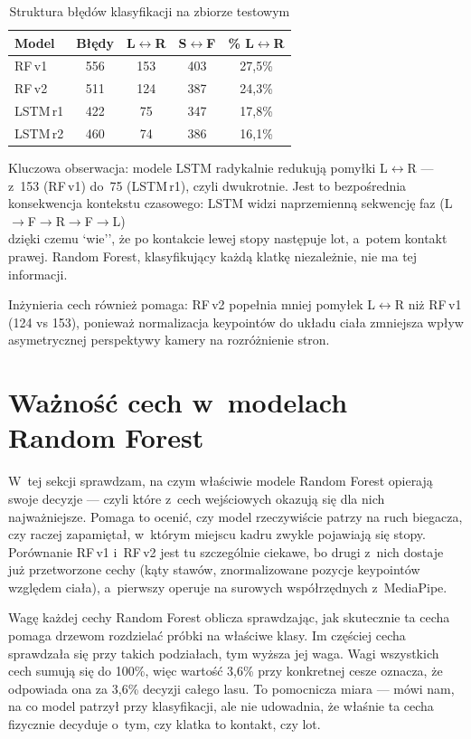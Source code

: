 \begin{table}[htbp]
\centering
\caption{Struktura błędów klasyfikacji na zbiorze testowym}
\label{tab:error-breakdown}
\small
\begin{tabular}{lcccc}
\hline
\textbf{Model} & \textbf{Błędy} & \textbf{L$\leftrightarrow$R} & \textbf{S$\leftrightarrow$F} & \textbf{\% L$\leftrightarrow$R} \\
\hline
RF\,v1   & 556 & 153 & 403 & 27{,}5\% \\
RF\,v2   & 511 & 124 & 387 & 24{,}3\% \\
LSTM\,r1 & 422 &  75 & 347 & 17{,}8\% \\
LSTM\,r2 & 460 &  74 & 386 & 16{,}1\% \\
\hline
\end{tabular}
\end{table}

Kluczowa obserwacja: modele LSTM radykalnie redukują pomyłki L$\leftrightarrow$R --- z~153 (RF\,v1) do~75 (LSTM\,r1), czyli dwukrotnie. Jest to bezpośrednia konsekwencja kontekstu czasowego: LSTM widzi naprzemienną sekwencję faz (L$\to$F$\to$R$\to$F$\to$L) \\dzięki czemu `wie'', że po kontakcie lewej stopy następuje lot, a~potem kontakt prawej. Random Forest, klasyfikujący każdą klatkę niezależnie, nie ma tej informacji.

Inżynieria cech również pomaga: RF\,v2 popełnia mniej pomyłek L$\leftrightarrow$R niż RF\,v1 (124 vs 153), ponieważ normalizacja keypointów do układu ciała zmniejsza wpływ asymetrycznej perspektywy kamery na rozróżnienie stron.


\section{Ważność cech w~modelach Random Forest}
\label{sec:feature-importance}

W~tej sekcji sprawdzam, na czym właściwie modele Random Forest opierają swoje decyzje --- czyli które z~cech wejściowych okazują się dla nich najważniejsze. Pomaga to ocenić, czy model rzeczywiście patrzy na ruch biegacza, czy raczej zapamiętał, w~którym miejscu kadru zwykle pojawiają się stopy. Porównanie RF\,v1 i~RF\,v2 jest tu szczególnie ciekawe, bo drugi z~nich dostaje już przetworzone cechy (kąty stawów, znormalizowane pozycje keypointów względem ciała), a~pierwszy operuje na surowych współrzędnych z~MediaPipe.

Wagę każdej cechy Random Forest oblicza sprawdzając, jak skutecznie ta cecha pomaga drzewom rozdzielać próbki na właściwe klasy. Im częściej cecha sprawdzała się przy takich podziałach, tym wyższa jej waga. Wagi wszystkich cech sumują się do 100\%, więc wartość 3{,}6\% przy konkretnej cesze oznacza, że odpowiada ona za 3{,}6\% decyzji całego lasu. To pomocnicza miara --- mówi nam, na co model patrzył przy klasyfikacji, ale nie udowadnia, że właśnie ta cecha fizycznie decyduje o~tym, czy klatka to kontakt, czy lot.

